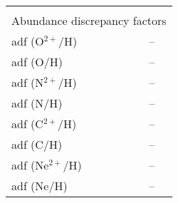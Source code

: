 \begin{longtable}[l]{ll}
 \vspace{0.2cm}\\\multicolumn{2}{l}{Abundance discrepancy factors}\\ \hline
 adf (O$^{2+}$/H)                    & -- \\
 adf (O/H)                           & -- \\
 adf (N$^{2+}$/H)                    & -- \\
 adf (N/H)                           & -- \\
 adf (C$^{2+}$/H)                    & -- \\
 adf (C/H)                           & -- \\
 adf (Ne$^{2+}$/H)                   & -- \\
 adf (Ne/H)                          & -- \\
 \end{longtable}
